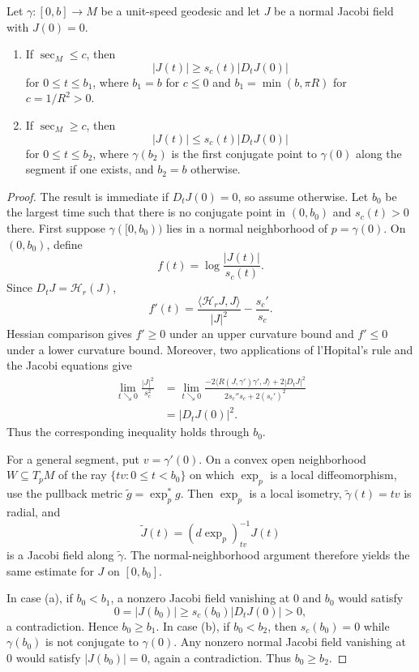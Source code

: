 \begin{theorem}
\label{thm:jacobi-field-comparison}
Let $\gamma\colon[0,b]\to M$ be a unit-speed geodesic and let $J$ be a normal
Jacobi field with $J(0)=0$.
\begin{enumerate}
\item[(a)] If $\sec_M\leq c$, then
\begin{equation}
|J(t)|\geq s_c(t)|D_tJ(0)| \tag{11.21}
\end{equation}
for $0\leq t\leq b_1$, where $b_1=b$ for $c\leq0$ and
$b_1=\min(b,\pi R)$ for $c=1/R^2>0$.
\item[(b)] If $\sec_M\geq c$, then
\begin{equation}
|J(t)|\leq s_c(t)|D_tJ(0)| \tag{11.22}
\end{equation}
for $0\leq t\leq b_2$, where $\gamma(b_2)$ is the first conjugate point to
$\gamma(0)$ along the segment if one exists, and $b_2=b$ otherwise.
\end{enumerate}
\end{theorem}

\begin{proof}
\sketch The result is immediate if $D_tJ(0)=0$, so assume otherwise. Let
$b_0$ be the largest time such that there is no conjugate point in $(0,b_0)$
and $s_c(t)>0$ there. First suppose $\gamma([0,b_0))$ lies in a normal
neighborhood of $p=\gamma(0)$. On $(0,b_0)$, define
\[
f(t)=\log\frac{|J(t)|}{s_c(t)}.
\]
Since $D_tJ=\mathcal H_r(J)$,
\[
f'(t)
=\frac{\langle\mathcal H_rJ,J\rangle}{|J|^2}
-\frac{s_c'}{s_c}.
\]
Hessian comparison gives $f'\geq0$ under an upper curvature bound and
$f'\leq0$ under a lower curvature bound. Moreover, two applications of
l'Hopital's rule and the Jacobi equations give
\begin{align*}
\lim_{t\searrow0}\frac{|J|^2}{s_c^2}
&=\lim_{t\searrow0}
\frac{-2\langle R(J,\gamma')\gamma',J\rangle+2|D_tJ|^2}
{2s_c''s_c+2(s_c')^2}\\
&=|D_tJ(0)|^2.
\end{align*}
Thus the corresponding inequality holds through $b_0$.

For a general segment, put $v=\gamma'(0)$. On a convex open neighborhood
$W\subseteq T_pM$ of the ray $\{tv:0\leq t<b_0\}$ on which $\exp_p$ is a
local diffeomorphism, use the pullback metric
$\widetilde g=\exp_p^*g$. Then $\exp_p$ is a local isometry,
$\widetilde\gamma(t)=tv$ is radial, and
\[
\widetilde J(t)=(d\exp_p)_{tv}^{-1}J(t)
\]
is a Jacobi field along $\widetilde\gamma$. The normal-neighborhood argument
therefore yields the same estimate for $J$ on $[0,b_0]$.

In case (a), if $b_0<b_1$, a nonzero Jacobi field vanishing at $0$ and $b_0$
would satisfy
\[
0=|J(b_0)|\geq s_c(b_0)|D_tJ(0)|>0,
\]
a contradiction. Hence $b_0\geq b_1$. In case (b), if $b_0<b_2$, then
$s_c(b_0)=0$ while $\gamma(b_0)$ is not conjugate to $\gamma(0)$. Any nonzero
normal Jacobi field vanishing at $0$ would satisfy $|J(b_0)|=0$, again a
contradiction. Thus $b_0\geq b_2$.
\end{proof}

